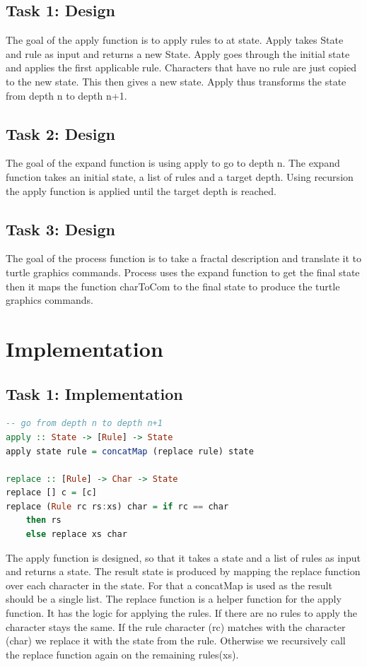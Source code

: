 \documentclass{article}
\begin{document}
\subsection{Task 1: Design}
The goal of the apply function is to apply rules to at state. Apply takes State and rule as input and returns a new State. Apply goes through the initial state and applies the first applicable rule. Characters that have no rule are just copied to the new state. This then gives a new state. Apply thus transforms the state from depth n to depth n+1.
 
\subsection{Task 2: Design}
The goal of the expand function is using apply to go to depth n. The expand function takes an initial state, a list of rules and a target depth. Using recursion the apply function is applied until the target depth is reached.

\subsection{Task 3: Design}
The goal of the process function is to take a fractal description and translate it to turtle graphics commands. Process uses the expand function to get the final state then it maps the function charToCom to the final state to produce the turtle graphics commands.

\section{Implementation}

\subsection{Task 1: Implementation}
\begin{lstlisting}[language=Haskell]
-- go from depth n to depth n+1
apply :: State -> [Rule] -> State
apply state rule = concatMap (replace rule) state  

replace :: [Rule] -> Char -> State
replace [] c = [c]
replace (Rule rc rs:xs) char = if rc == char
    then rs
    else replace xs char
\end{lstlisting}
The apply function is designed, so that it takes a state and a list of rules as input and returns a state. The result state is produced by mapping the replace function over each character in the state. For that a concatMap is used as the result should be a single list. The replace function is a helper function for the apply function. It has the logic for applying the rules. If there are no rules to apply the character stays the same. If the rule character (rc) matches with the character (char) we replace it with the state from the rule. Otherwise we recursively call the replace function again on the remaining rules(xs). 
\end{document}
